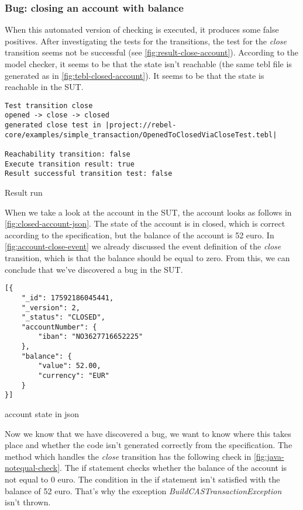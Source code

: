 \subsubsection{Bug: closing an account with balance}\label{sec:bug-close-account}
When this automated version of checking is executed, it produces some false
positives. After investigating the tests for the transitions, the test for the \textit{close}
transition seems not be successful (see \autoref{fig:result-close-account}).
According to the model checker, it seems to be that the state isn't reachable
(the same tebl file is generated as in \autoref{fig:tebl-closed-account}). It
seems to be that the state is reachable in the SUT.

\begin{sourcecode}[h!]
\begin{lstlisting}[]
Test transition close
opened -> close -> closed
generated close test in |project://rebel-core/examples/simple_transaction/OpenedToClosedViaCloseTest.tebl|

Reachability transition: false
Execute transition result: true
Result successful transition test: false
\end{lstlisting}
\caption{Result run}\label{fig:result-close-account}
\end{sourcecode}

When we take a look at the account in the SUT, the account looks as
follows in \autoref{fig:closed-account-json}. The state of the account is in
closed, which is correct according to the specification, but the balance of the
account is 52 euro. In \autoref{fig:account-close-event} we already discussed
the event  definition of the \textit{close} transition, which is that the
balance should be equal to zero. From this, we can conclude that we've
discovered a bug in the SUT.

\begin{sourcecode}[h!]
\begin{lstlisting}[]
[{
	"_id": 17592186045441,
	"_version": 2,
	"_status": "CLOSED",
	"accountNumber": {
		"iban": "NO3627716652225"
	},
	"balance": {
		"value": 52.00,
		"currency": "EUR"
	}
}]
\end{lstlisting}
\caption{account state in json}\label{fig:closed-account-json}
\end{sourcecode}

Now we know that we have discovered a bug, we want to know where this takes
place and whether the code isn't generated correctly from the specification. The
method which handles the \textit{close} transition has the following check in
\autoref{fig:java-notequal-check}. The if statement checks whether the balance
of the account is not equal to 0 euro. The condition in the if statement isn't
satisfied with the balance of 52 euro. That's why the exception
\textit{BuildCASTransactionException} isn't thrown.

